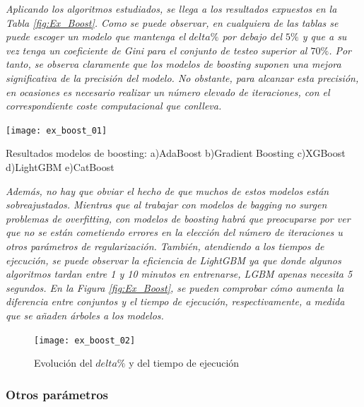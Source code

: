 \documentclass[12pt,twoside]{article}
\begin{document}
\emph{Aplicando los algoritmos estudiados, se llega a los resultados expuestos en la Tabla \ref{fig:Ex_Boost}. Como se puede observar, en cualquiera de las tablas se puede escoger un modelo que mantenga el $delta\%$ por debajo del $5\%$ y que a su vez tenga un coeficiente de Gini para el conjunto de testeo superior al $70\%$. Por tanto, se observa claramente que los modelos de boosting suponen una mejora significativa de la precisión del modelo. No obstante, para alcanzar esta precisión, en ocasiones es necesario realizar un número elevado de iteraciones, con el correspondiente coste computacional que conlleva.}

\begin{table}[h]
\centering
\texttt{[image: ex\_boost\_01]}
\caption{Resultados modelos de boosting: a)AdaBoost b)Gradient Boosting c)XGBoost d)LightGBM e)CatBoost}
\label{fig:Ex_Boost}
\end{table}


\emph{Además, no hay que obviar el hecho de que muchos de estos modelos están sobreajustados. Mientras que al trabajar con modelos de bagging no surgen problemas de overfitting, con modelos de boosting habrá que preocuparse por ver que no se están cometiendo errores en la elección del número de iteraciones u otros parámetros de regularización. También, atendiendo a los tiempos de ejecución, se puede observar la eficiencia de LightGBM ya que donde algunos algoritmos tardan entre 1 y 10 minutos en entrenarse, LGBM apenas necesita 5 segundos. En la Figura \ref{fig:Ex_Boost}, se pueden comprobar cómo aumenta la diferencia entre conjuntos y el tiempo de ejecución, respectivamente, a medida que se añaden árboles a los modelos.}

\begin{figure}[h]
\centering
\texttt{[image: ex\_boost\_02]}
\caption{Evolución del $delta\%$ y del tiempo de ejecución}
\end{figure}





\subsubsection{Otros parámetros}
\end{document}
